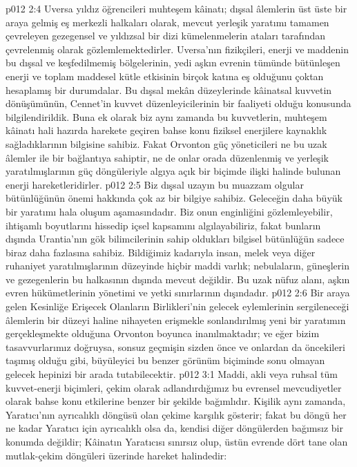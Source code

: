 \vs p012 2:4 Uversa yıldız öğrencileri muhteşem kâinatı; dışsal âlemlerin üst üste bir araya gelmiş eş merkezli halkaları olarak, mevcut yerleşik yaratımı tamamen çevreleyen gezegensel ve yıldızsal bir dizi kümelenmelerin ataları tarafından çevrelenmiş olarak gözlemlemektedirler. Uversa’nın fizikçileri, enerji ve maddenin bu dışsal ve keşfedilmemiş bölgelerinin, yedi aşkın evrenin tümünde bütünleşen enerji ve toplam maddesel kütle etkisinin birçok katına eş olduğunu çoktan hesaplamış bir durumdalar. Bu dışsal mekân düzeylerinde kâinatsal kuvvetin dönüşümünün, Cennet’in kuvvet düzenleyicilerinin bir faaliyeti olduğu konusunda bilgilendirildik. Buna ek olarak biz aynı zamanda bu kuvvetlerin, muhteşem kâinatı hali hazırda harekete geçiren bahse konu fiziksel enerjilere kaynaklık sağladıklarının bilgisine sahibiz. Fakat Orvonton güç yöneticileri ne bu uzak âlemler ile bir bağlantıya sahiptir, ne de onlar orada düzenlenmiş ve yerleşik yaratılmışlarının güç döngüleriyle algıya açık bir biçimde ilişki halinde bulunan enerji hareketleridirler.
\vs p012 2:5 Biz dışsal uzayın bu muazzam olgular bütünlüğünün önemi hakkında çok az bir bilgiye sahibiz. Geleceğin daha büyük bir yaratımı hala oluşum aşamasındadır. Biz onun enginliğini gözlemleyebilir, ihtişamlı boyutlarını hissedip içsel kapsamını algılayabiliriz, fakat bunların dışında Urantia’nın gök bilimcilerinin sahip oldukları bilgisel bütünlüğün sadece biraz daha fazlasına sahibiz. Bildiğimiz kadarıyla insan, melek veya diğer ruhaniyet yaratılmışlarının düzeyinde hiçbir maddi varlık; nebulaların, güneşlerin ve gezegenlerin bu halkasının dışında mevcut değildir. Bu uzak nüfuz alanı, aşkın evren hükümetlerinin yönetimi ve yetki sınırlarının dışındadır.
\vs p012 2:6 Bir araya gelen Kesinliğe Erişecek Olanların Birlikleri’nin gelecek eylemlerinin sergileneceği âlemlerin bir düzeyi haline nihayeten erişmekle sonlandırılmış yeni bir yaratımın gerçekleşmekte olduğuna Orvonton boyunca inanılmaktadır; ve eğer bizim tasavvurlarımız doğruysa, sonsuz geçmişin sizden önce ve onlardan da öncekileri taşımış olduğu gibi, büyüleyici bu benzer görünüm biçiminde sonu olmayan gelecek hepinizi bir arada tutabilecektir.
\vs p012 3:1 Maddi, akli veya ruhsal tüm kuvvet\hyp{}enerji biçimleri, çekim olarak adlandırdığımız bu evrensel mevcudiyetler olarak bahse konu etkilerine benzer bir şekilde bağımlıdır. Kişilik aynı zamanda, Yaratıcı’nın ayrıcalıklı döngüsü olan çekime karşılık gösterir; fakat bu döngü her ne kadar Yaratıcı için ayrıcalıklı olsa da, kendisi diğer döngülerden bağımsız bir konumda değildir; Kâinatın Yaratıcısı sınırsız olup, üstün evrende dört tane olan  mutlak\hyp{}çekim döngüleri üzerinde hareket halindedir:
